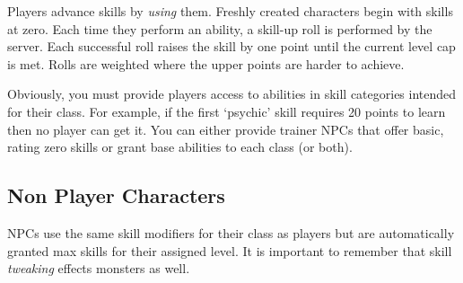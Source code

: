 Players advance skills by \emph{using} them.  Freshly created characters begin
with skills at zero.  Each time they perform an ability, a skill-up roll is
performed by the server.  Each successful roll raises the skill by one point
until the current level cap is met.  Rolls are weighted where the upper points
are harder to achieve.

Obviously, you must provide players access to abilities in skill categories
intended for their class. For example, if the first `psychic' skill requires
20 points to learn then no player can get it.  You can either provide trainer
NPCs that offer basic, rating zero skills or grant base abilities to each class 
(or both).  

\subsection{Non Player Characters}

NPCs use the same skill modifiers for their class as players but are
automatically granted max skills for their assigned level.  It is important to
remember that skill \emph{tweaking} effects monsters as well. 
    

 

    
